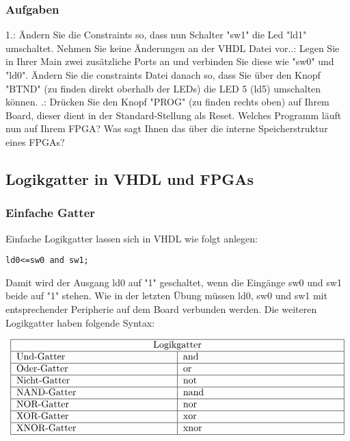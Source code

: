 \documentclass{article}
\begin{document}
\subsubsection{Aufgaben}
1.: \"Andern Sie die Constraints so, dass nun Schalter "sw1" die Led "ld1" umschaltet. Nehmen Sie keine \"Anderungen an der VHDL Datei vor..: Legen Sie in Ihrer Main zwei zus\"atzliche Ports an und verbinden Sie diese wie "sw0" und "ld0". \"Andern Sie die constraints Datei danach so, dass Sie über den Knopf "BTND" (zu finden direkt oberhalb der LEDs) die LED 5 (ld5) umschalten k\"onnen. .: Dr\"ucken Sie den Knopf "PROG" (zu finden rechts oben) auf Ihrem Board, dieser dient in der Standard-Stellung als Reset. Welches Programm l\"auft nun auf Ihrem FPGA? Was sagt Ihnen das \"uber die interne Speicherstruktur eines FPGAs?\newline

\subsection{Logikgatter in VHDL und FPGAs}
\subsubsection{Einfache Gatter}
Einfache Logikgatter lassen sich in VHDL wie folgt anlegen:
\begin{verbatim}
ld0<=sw0 and sw1;
\end{verbatim}
Damit wird der Ausgang ld0 auf "1" geschaltet, wenn die Eing\"ange sw0 und sw1 beide auf "1" stehen. Wie in der letzten \"Ubung m\"ussen ld0, sw0 und sw1 mit entsprechender Peripherie auf dem Board verbunden werden. Die weiteren Logikgatter haben folgende Syntax:

$$\begin{tabular}{|p{0.47\textwidth}|p{0.47\textwidth}|}
\hline
\multicolumn{2}{|c|}{Logikgatter}\\
\hline
Und-Gatter & and\\
\hline
Oder-Gatter & or\\
\hline
Nicht-Gatter & not\\
\hline
NAND-Gatter & nand\\
\hline
NOR-Gatter & nor\\
\hline
XOR-Gatter & xor\\
\hline
XNOR-Gatter & xnor\\
\hline
\end{tabular}{}$$
\end{document}
